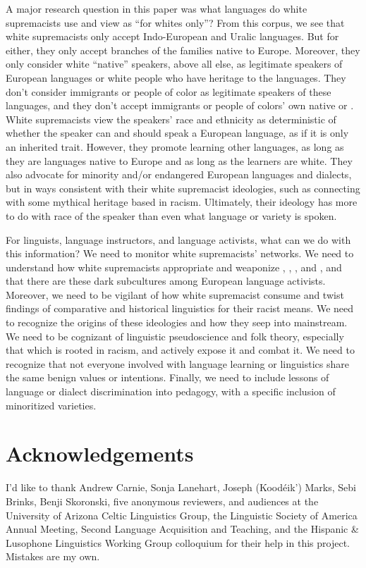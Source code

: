 \documentclass[output=paper,colorlinks,citecolor=brown]{langscibook}
\begin{document}
A major research question in this paper was what languages do white supremacists use and view as “for whites only”? From this corpus, we see that white supremacists only accept Indo-European and Uralic languages. But for either, they only accept branches of the families native to Europe. Moreover, they only consider white “native” speakers, above all else, as legitimate speakers of European languages or white people who have heritage to the languages. They don't consider immigrants or people of color as legitimate speakers of these languages, and they don't accept immigrants or people of colors' own native or . White supremacists view the speakers' race and ethnicity as deterministic of whether the speaker can and should speak a European language, as if it is only an inherited trait. However, they promote learning other languages, as long as they are languages native to Europe and as long as the learners are white. They also advocate for minority and/or endangered European languages and dialects, but in ways consistent with their white supremacist ideologies, such as connecting with some mythical heritage based in racism. Ultimately, their ideology has more to do with race of the speaker than even what language or variety is spoken.

For linguists, language instructors, and language activists, what can we do with this information? We need to monitor white supremacists' networks. We need to understand how white supremacists appropriate and weaponize , , , and , and that there are these dark subcultures among European language activists. Moreover, we need to be vigilant of how white supremacist consume and twist findings of comparative and historical linguistics for their racist means. We need to recognize the origins of these ideologies and how they seep into mainstream. We need to be cognizant of linguistic pseudoscience and folk theory, especially that which is rooted in racism, and actively expose it and combat it. We need to recognize that not everyone involved with language learning or linguistics share the same benign values or intentions. Finally, we need to include lessons of language or dialect discrimination into pedagogy, with a specific inclusion of minoritized varieties.

\section*{Acknowledgements}

I'd like to thank Andrew Carnie, Sonja Lanehart, Joseph (Koodéik') Marks, Sebi Brinks, Benji Skoronski, five anonymous reviewers, and audiences at the University of Arizona Celtic Linguistics Group, the Linguistic Society of America Annual Meeting, Second Language Acquisition and Teaching, and the Hispanic \& Lusophone Linguistics Working Group colloquium for their help in this project. Mistakes are my own.
\sloppy
\printbibliography[heading=subbibliography,notkeyword=this]
\end{document}
